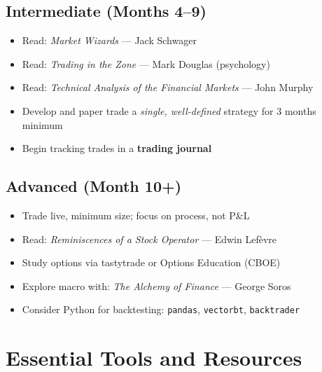\subsection{Intermediate (Months 4--9)}
\begin{itemize}[noitemsep]
  \item Read: \textit{Market Wizards} — Jack Schwager
  \item Read: \textit{Trading in the Zone} — Mark Douglas (psychology)
  \item Read: \textit{Technical Analysis of the Financial Markets} — John Murphy
  \item Develop and paper trade a \emph{single, well-defined} strategy for 3 months minimum
  \item Begin tracking trades in a \textbf{trading journal}
\end{itemize}

\subsection{Advanced (Month 10+)}
\begin{itemize}[noitemsep]
  \item Trade live, minimum size; focus on process, not P\&L
  \item Read: \textit{Reminiscences of a Stock Operator} — Edwin Lefèvre
  \item Study options via tastytrade or Options Education (CBOE)
  \item Explore macro with: \textit{The Alchemy of Finance} — George Soros
  \item Consider Python for backtesting: \texttt{pandas}, \texttt{vectorbt}, \texttt{backtrader}
\end{itemize}

\section{Essential Tools and Resources}


